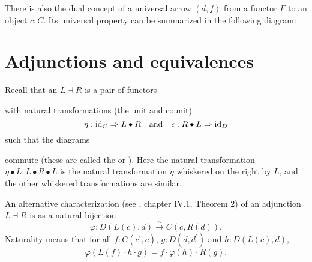 There is also the dual concept of a universal arrow $ (d, f) $ from a functor $ F $ to an object $ c: C $. Its universal property can be summarized in the following diagram:
\begin{center}
\end{center}

\section{Adjunctions and equivalences}

Recall that an  $ L \dashv R $ is a pair of functors
\begin{center}
\end{center}
with natural transformations (the unit and counit)
\[ \eta: \text{id}_{C} \Rightarrow L \bullet R \quad \text{and} \quad \epsilon: R \bullet L \Rightarrow \text{id}_{D} \]
such that the diagrams
\begin{center}
  \qquad
\end{center}
commute (these are called the  or ). Here the natural transformation $ \eta \bullet L: L \bullet R \bullet L $ is the natural transformation $ \eta $ whiskered on the right by $ L $, and the other whiskered transformations are similar.

An alternative characterization (see \autocite{MacLane}, chapter IV.1, Theorem 2) of an adjunction $ L \dashv R $ is as a natural bijection
\[ \varphi: D(L(c), d) \xrightarrow{\sim} C(c, R(d)). \]
Naturality means that for all $ f: C(c^\prime, c) $, $ g: D(d, d^\prime) $ and $ h: D(L(c), d) $,
\[ \varphi(L(f) \cdot h \cdot g) = f \cdot \varphi(h) \cdot R(g). \]

